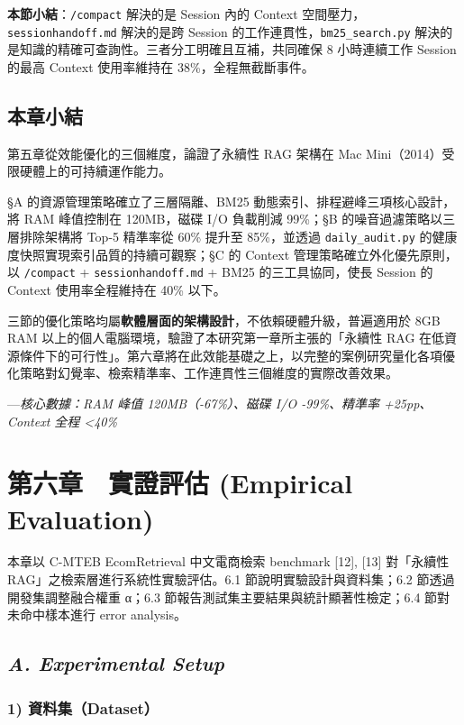 \textbf{本節小結}：\texttt{/compact} 解決的是 Session 內的 Context
空間壓力，\texttt{sessionhandoff.md} 解決的是跨 Session
的工作連貫性，\texttt{bm25\_search.py}
解決的是知識的精確可查詢性。三者分工明確且互補，共同確保 8 小時連續工作
Session 的最高 Context 使用率維持在 38\%，全程無截斷事件。

\section{本章小結}\label{ux672cux7ae0ux5c0fux7d50-2}

第五章從效能優化的三個維度，論證了永續性 RAG 架構在 Mac
Mini（2014）受限硬體上的可持續運作能力。

§A 的資源管理策略確立了三層隔離、BM25 動態索引、排程避峰三項核心設計，將
RAM 峰值控制在 120MB，磁碟 I/O 負載削減 99\%；§B
的噪音過濾策略以三層排除架構將 Top-5 精準率從 60\% 提升至 85\%，並透過
\texttt{daily\_audit.py} 的健康度快照實現索引品質的持續可觀察；§C 的
Context 管理策略確立外化優先原則，以 \texttt{/compact} +
\texttt{sessionhandoff.md} + BM25 的三工具協同，使長 Session 的 Context
使用率全程維持在 40\% 以下。

三節的優化策略均屬\textbf{軟體層面的架構設計}，不依賴硬體升級，普遍適用於
8GB RAM 以上的個人電腦環境，驗證了本研究第一章所主張的「永續性 RAG
在低資源條件下的可行性」。第六章將在此效能基礎之上，以完整的案例研究量化各項優化策略對幻覺率、檢索精準率、工作連貫性三個維度的實際改善效果。

---\emph{核心數據：RAM 峰值 120MB（-67\%）、磁碟 I/O -99\%、精準率
+25pp、Context 全程 \textless40\%}

\chapter{第六章　實證評估 (Empirical Evaluation)}\label{ux7b2cux516dux7ae0-ux5be6ux8b49ux8a55ux4f30}

本章以 C-MTEB EcomRetrieval 中文電商檢索 benchmark {[}12{]}, {[}13{]}
對「永續性 RAG」之檢索層進行系統性實驗評估。6.1 節說明實驗設計與資料集；6.2
節透過開發集調整融合權重 α；6.3 節報告測試集主要結果與統計顯著性檢定；6.4
節對未命中樣本進行 error analysis。

\section{\texorpdfstring{\emph{A. Experimental Setup}}{A. Experimental Setup}}\label{a.-experimental-setup}

\subsection{1) 資料集（Dataset）}\label{ux6848ux6599ux96c6}

